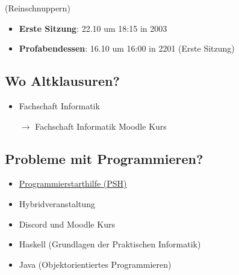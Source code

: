 \documentclass[
	aspectratio=169, 
	10pt 
]{beamer}
\begin{document}
\begin{frame}{\insertsubsection (Reinschnuppern)}
    \begin{itemize}
        \item \textbf{Erste Sitzung}: 22.10 um 18:15 in 2003
        \item \textbf{Profabendessen}: 16.10 um 16:00 in 2201 (Erste Sitzung)
    \end{itemize}
\end{frame}

\subsection{Wo Altklausuren?}
\begin{frame}{\insertsubsection}
    \begin{fancycolumns}[widths={30}]
        \nextcolumn

        \centering
        \begin{minipage}[C]{0.8\textwidth}
            \begin{itemize}
                \item Fachschaft Informatik
                \item[$\rightarrow$] Fachschaft Informatik Moodle Kurs 
            \end{itemize}
        \end{minipage}
    \end{fancycolumns}
\end{frame}

\subsection{Probleme mit Programmieren?}
\begin{frame}{\insertsubsection}
    \begin{fancycolumns}[widths={30}]
        \nextcolumn

        \centering
        \begin{minipage}[C]{0.8\textwidth}
            \begin{itemize}
                \item \underline{\href{https://moodle.uni-ulm.de/course/view.php?id=53212}{Programmierstarthilfe (PSH)}}
                \item Hybridveranstaltung
                \item Discord und Moodle Kurs 
                \item Haskell (Grundlagen der Praktischen Informatik)
                \item Java (Objektorientiertes Programmieren)
            \end{itemize}
        \end{minipage}
    \end{fancycolumns}
\end{frame}
\end{document}
